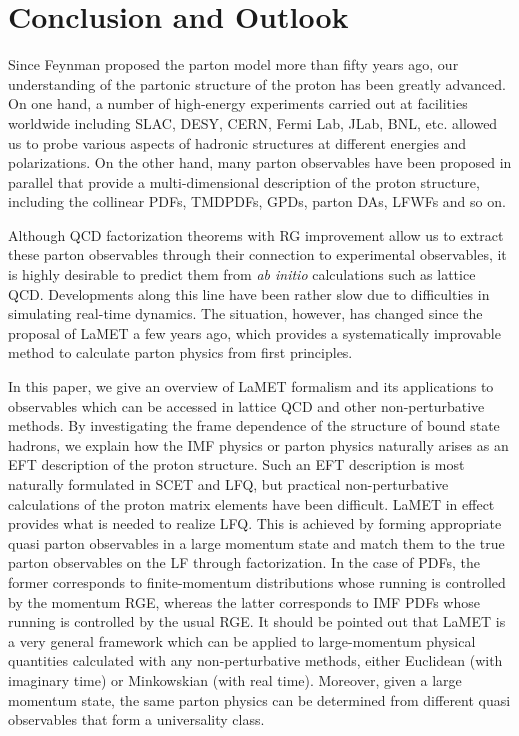 \documentclass[aps,rmp,reprint,amsmath,amssymb,graphicx,longbibliography]{revtex4-1} %
\begin{document}
\section{Conclusion and Outlook}
\label{sec:conclusion}

Since Feynman proposed the parton model more than fifty years ago, our understanding of the partonic structure of the proton has been greatly advanced. On one hand, a number of high-energy experiments carried out at facilities worldwide including SLAC, DESY, CERN, Fermi Lab, JLab, BNL, etc. allowed us to probe various aspects of hadronic structures at different energies and polarizations. On the other hand, many parton observables have been proposed in parallel
that provide a multi-dimensional description of the proton structure, including the collinear
PDFs, TMDPDFs, GPDs, parton DAs, LFWFs and so on.

Although QCD factorization theorems with RG improvement allow us to extract these parton observables through their connection to experimental observables, it is highly desirable to predict them from {\it ab initio}
calculations such as lattice QCD. Developments along this line have been rather slow due to
difficulties in simulating real-time dynamics. The situation, however, has changed since the proposal of LaMET a few years ago, which provides a systematically improvable method to calculate parton physics from first principles.

In this paper, we give an overview of LaMET formalism and its applications to observables which
can be accessed in lattice QCD and other non-perturbative methods.  By investigating the frame dependence of the structure of bound state hadrons, we explain how the IMF physics or parton physics naturally arises as an EFT description of the proton structure. Such an EFT description is most naturally formulated in SCET and LFQ,
but practical non-perturbative calculations of the proton matrix elements
have been difficult. LaMET in effect provides what is needed to realize LFQ. This is achieved by forming appropriate quasi parton observables in a large momentum state and match them to the true parton observables on the LF through factorization. In the case of PDFs, the former corresponds to finite-momentum distributions whose running is controlled by the momentum RGE, whereas the latter corresponds to IMF PDFs whose running is controlled by the usual RGE. It should be pointed out that
LaMET is a very general framework which can be applied to
large-momentum physical quantities calculated with any non-perturbative methods,
either Euclidean (with imaginary time) or Minkowskian (with real time).
Moreover, given a large momentum state, the same parton physics can be determined
from different quasi observables that form a universality class.
\end{document}
